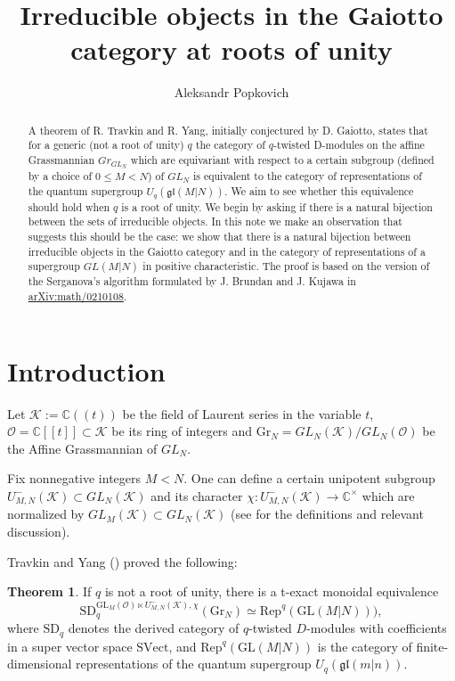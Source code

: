 \documentclass[12pt]{amsart}
\title{Irreducible objects in the Gaiotto category at roots of unity}
\author[Aleksandr Popkovich]{Aleksandr Popkovich}
\numberwithin{equation}{section}
\numberwithin{equation}{section}
\theoremstyle{definition}
\newtheorem{theorem}{Theorem}
\begin{document}
\begin{abstract}
 A theorem of R. Travkin and R. Yang, initially conjectured by D. Gaiotto, states that for a generic (not a root of unity) $q$ the category of  $q$-twisted D-modules on the affine Grassmannian $Gr_{GL_N}$ which are equivariant with respect to a certain subgroup (defined by a choice of $0 \le M <N$) of $GL_N$ is equivalent to the category of representations of the quantum supergroup $U_q(\mathfrak{gl}(M|N))$. We aim to see whether this equivalence should hold when $q$ is a root of unity. We begin by asking if there is a natural bijection between the sets of irreducible objects. In this note we make an observation that suggests this should be the case: we show that there is a natural bijection between irreducible objects in the Gaiotto category and in the category of representations of a supergroup $GL(M|N)$ in positive characteristic. The proof is based on the version of the Serganova's algorithm formulated by J. Brundan and J. Kujawa in \url{	arXiv:math/0210108}.
\end{abstract}

\maketitle

\section{Introduction}

Let $\mathcal{K} :=\mathbb{C}((t))$ be the field of Laurent series in the variable $t$, $\mathcal{O} = \mathbb{C}[[t]] \subset \mathcal{K}$ be its ring of integers and $\mathrm{Gr}_N = GL_N(\mathcal{K})/GL_N(\mathcal{O})$ be the Affine Grassmannian of $GL_N$.

Fix nonnegative integers $M<N$. One can define a certain unipotent subgroup $U_{M,N}^{-}(\mathcal{K}) \subset GL_N(\mathcal{K})$ and its character $\chi: U_{M,N}^{-}(\mathcal{K})\to \mathbb{C}^\times$ which are normalized by $GL_M(\mathcal{K}) \subset GL_N(\mathcal{K})$ (see \cite{ty} for the definitions and relevant discussion).

Travkin and Yang (\cite{ty}) proved the following:

\begin{theorem}
If $q$ is not a root of unity, there is a t-exact monoidal equivalence
\begin{equation}
\label{TY_theorem}
\mathrm{SD}_q^{\mathrm{GL}_M(\mathcal{O}) \ltimes U_{M,N}^{-}(\mathcal{K}), \chi}(\mathrm{Gr}_N) \simeq \mathrm{Rep}^q(\mathrm{GL}(M|N))),
\end{equation}
where $\mathrm{SD}_q$ denotes the derived category of $q$-twisted $D$-modules with coefficients in a super vector space $\mathrm{SVect}$, and $\mathrm{Rep}^q(\mathrm{GL}(M|N))$ is the category of finite-dimensional representations of the quantum supergroup $U_q(\mathfrak{gl}(m|n))$.
\end{theorem}
\end{document}
